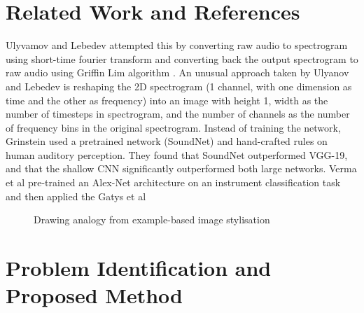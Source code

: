 \documentclass[10pt,twocolumn,letterpaper]{article}
\begin{document}
\section{Related Work and References}
Ulyvamov and Lebedev\cite{Authors00003} attempted this by converting raw audio to spectrogram
using short-time fourier transform and converting
back the output spectrogram to raw audio using Griffin Lim
algorithm \cite{Authors00004}. An unusual approach taken by Ulyanov and
Lebedev is reshaping the 2D spectrogram (1 channel, with one dimension as time and the other as frequency) into an image with height 1, width as the number of timesteps in spectrogram, and the number of channels as the number of frequency bins in the original spectrogram. Instead of training the network, Grinstein\cite{Authors00005}
used a pretrained network (SoundNet) and hand-crafted
rules on human auditory perception. They found that SoundNet outperformed VGG-19, and that the shallow CNN significantly outperformed both large networks. Verma et al \cite{Authors00006} pre-trained an Alex-Net architecture \cite{Authors00007} on an instrument classification task and then applied the Gatys et al \cite{Authors00001}




\begin{figure}
\begin{center}
\end{center}
   \caption{Drawing analogy from example-based image stylisation}
\label{fig:short}
\end{figure}

\section{Problem Identification and Proposed Method}
\end{document}
